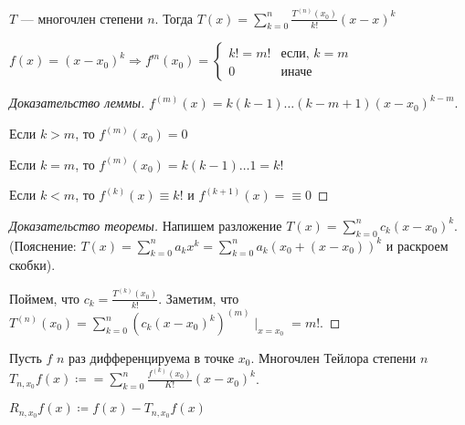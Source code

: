 \begin{theorem}
    $T$ --- многочлен степени  $n$. Тогда  $T(x) = \sum_{k=0}^n \frac{T^{(n)}(x_0)}{k!}(x - x)^k$
\end{theorem}
\begin{lemma}
    $f(x) = (x-x_0)^k \Rightarrow f^{m}(x_0) = \begin{cases} k! = m! & \text{если, }k=m \\ 0 & \text{иначе} \end{cases}$
\end{lemma}
\begin{proof}[Доказательство леммы]
    $f^{(m)}(x) = k(k-1)\ldots(k - m + 1)(x-x_0)^{k-m}$.

    Если $k > m$, то  $f^{(m)}(x_0) = 0$

    Если $k = m$, то  $f^{(m)}(x_0) = k(k-1)\ldots 1 = k!$

    Если $k < m$, то  $f^{(k)}(x) \equiv k!$ и  $f^{(k + 1)}(x) = \equiv 0$
\end{proof}
\begin{proof}[Доказательство теоремы]
    Напишем разложение $T(x) = \sum_{k=0}^n c_k(x-x_0)^k$. (Пояснение: $T(x) = \sum_{k=0}^n a_k x^k = \sum_{k=0}^n a_k(x_0 + (x-x_0))^k$ и раскроем скобки).

    Поймем, что $c_k = \frac{T^{(k)}(x_0)}{k!}$. Заметим, что $T^{(n)}(x_0) = \sum_{k=0}^{n} (c_k(x-x_0)^k)^{(m)} \mid_{x=x_0} = m!$.
\end{proof}
\begin{definition}
    Пусть $f$  $n$ раз дифференцируема в точке  $x_0$. Многочлен Тейлора степени $n$  $T_{n, x_0} f(x) \coloneqq = \sum_{k=0}^n \frac{f^{(k)}(x_0)}{K!}(x-x_0)^k$.

    $R_{n, x_0}f(x) \coloneqq f(x) - T_{n, x_0}f(x)$
\end{definition}

